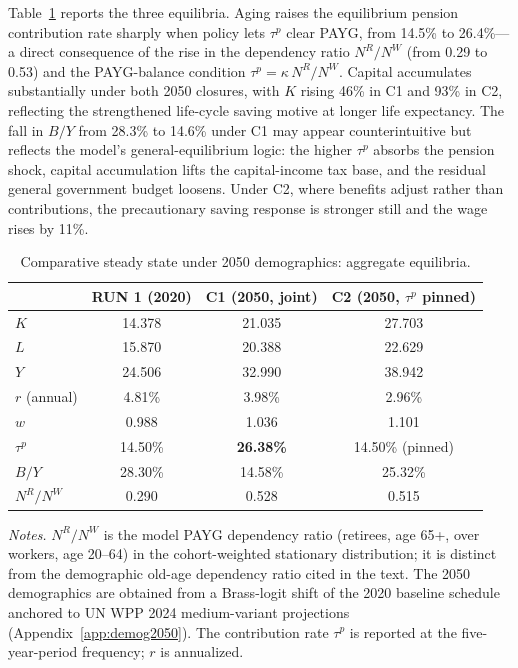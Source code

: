 \documentclass[12pt,a4paper]{article}
\begin{document}
Table~\ref{tab:aging_comparison} reports the three equilibria. Aging raises the equilibrium pension contribution rate sharply when policy lets $\tau^p$ clear PAYG, from 14.5\% to 26.4\%---a direct consequence of the rise in the dependency ratio $N^R/N^W$ (from 0.29 to 0.53) and the PAYG-balance condition $\tau^p = \kappa\, N^R/N^W$. Capital accumulates substantially under both 2050 closures, with $K$ rising 46\% in C1 and 93\% in C2, reflecting the strengthened life-cycle saving motive at longer life expectancy. The fall in $B/Y$ from 28.3\% to 14.6\% under C1 may appear counterintuitive but reflects the model's general-equilibrium logic: the higher $\tau^p$ absorbs the pension shock, capital accumulation lifts the capital-income tax base, and the residual general government budget loosens. Under C2, where benefits adjust rather than contributions, the precautionary saving response is stronger still and the wage rises by 11\%.

\begin{table}[H]
\centering
\caption{Comparative steady state under 2050 demographics: aggregate equilibria.}
\label{tab:aging_comparison}
\begin{tabular}{lccc}
\toprule
 & RUN 1 (2020) & C1 (2050, joint) & C2 (2050, $\tau^p$ pinned) \\
\midrule
$K$               & 14.378 & 21.035          & 27.703 \\
$L$               & 15.870 & 20.388          & 22.629 \\
$Y$               & 24.506 & 32.990          & 38.942 \\
$r$ (annual)      & 4.81\% & 3.98\%          & 2.96\% \\
$w$               & 0.988  & 1.036           & 1.101  \\
$\tau^p$          & 14.50\% & \textbf{26.38\%} & 14.50\% (pinned) \\
$B/Y$             & 28.30\% & 14.58\%        & 25.32\% \\
$N^R/N^W$         & 0.290  & 0.528           & 0.515  \\
\bottomrule
\end{tabular}

\vspace{0.5em}
\begin{minipage}{0.92\textwidth}
\footnotesize \textit{Notes.} $N^R/N^W$ is the model PAYG dependency ratio (retirees, age 65+, over workers, age 20--64) in the cohort-weighted stationary distribution; it is distinct from the demographic old-age dependency ratio cited in the text. The 2050 demographics are obtained from a Brass-logit shift of the 2020 baseline schedule anchored to UN WPP 2024 medium-variant projections (Appendix~\ref{app:demog2050}). The contribution rate $\tau^p$ is reported at the five-year-period frequency; $r$ is annualized.
\end{minipage}
\end{table}
\end{document}
